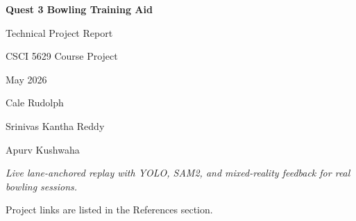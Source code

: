 \documentclass[11pt]{article}
\begin{document}

\begin{titlepage}
  \centering
  \vspace*{1.25in}

  {\Huge\bfseries Quest 3 Bowling Training Aid\par}
  \vspace{0.25in}
  {\Large Technical Project Report\par}

  \vspace{0.55in}
  {\large CSCI 5629 Course Project\par}
  \vspace{0.12in}
  {\large May 2026\par}

  \vspace{0.55in}
  {\large Cale Rudolph\par}
  \vspace{0.08in}
  {\large Srinivas Kantha Reddy\par}
  \vspace{0.08in}
  {\large Apurv Kushwaha\par}

  \vspace{0.75in}
  \begin{minipage}{0.68\textwidth}
    \centering
    \normalsize\itshape
    Live lane-anchored replay with YOLO, SAM2, and mixed-reality feedback for real bowling sessions.
  \end{minipage}

  \vfill
  {\small Project links are listed in the References section.}
\end{titlepage}

\clearpage
{}

\begin{abstract}
Quest 3 Bowling Training Aid is a mixed-reality bowling replay prototype for Meta Quest 3 and a Windows laptop. The headset captures passthrough camera video from a real bowling lane, encodes it as H.264, sends frame metadata and lane calibration information to the laptop, and receives shot results back from the laptop. The laptop detects a bowling ball with a dedicated YOLO26s detector, initializes SAM2 camera tracking from that seed, reconstructs the ball path in lane coordinates, computes bowling-specific statistics, and publishes replay results. The headset then renders the result as a lane-anchored trajectory replay with shot statistics and a session review interface.

The main contribution of the project is not any single detector or overlay. The key contribution is a working end-to-end loop: physical lane calibration, live capture, robust networking, model inference, geometric reconstruction, result validation, and mixed-reality feedback. The final prototype demonstrates that an ordinary bowling alley can be augmented with immediate coaching feedback using a consumer headset and a laptop, while still being honest about the limitations of camera-based tracking near the pin deck.
\end{abstract}
\end{document}
